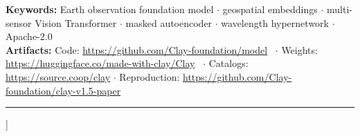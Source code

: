 \documentclass[10pt,twocolumn,letterpaper]{article}
\begin{document}
{\begin{@twocolumnfalse}
{\footnotesize\textcolor{ClaySlate}{\textbf{Keywords:} Earth observation foundation model $\cdot$ geospatial embeddings $\cdot$ multi-sensor Vision Transformer $\cdot$ masked autoencoder $\cdot$ wavelength hypernetwork $\cdot$ Apache-2.0}\\
\textbf{Artifacts:} Code: \url{https://github.com/Clay-foundation/model}~\cite{clay2024model} $\cdot$ Weights: \url{https://huggingface.co/made-with-clay/Clay}~\cite{clay2024hf} $\cdot$ Catalogs: \url{https://source.coop/clay} $\cdot$ Reproduction: \url{https://github.com/Clay-foundation/clay-v1.5-paper}\par}
{\smallskip\noindent\color{RuleGrey}\rule{\textwidth}{0.6pt}\par\medskip}
\end{@twocolumnfalse}
}]
\raggedbottom






\FloatBarrier

{\footnotesize\raggedright\setlength{\bibsep}{1.5pt plus 1.5pt minus 0.5pt}}
\end{document}

